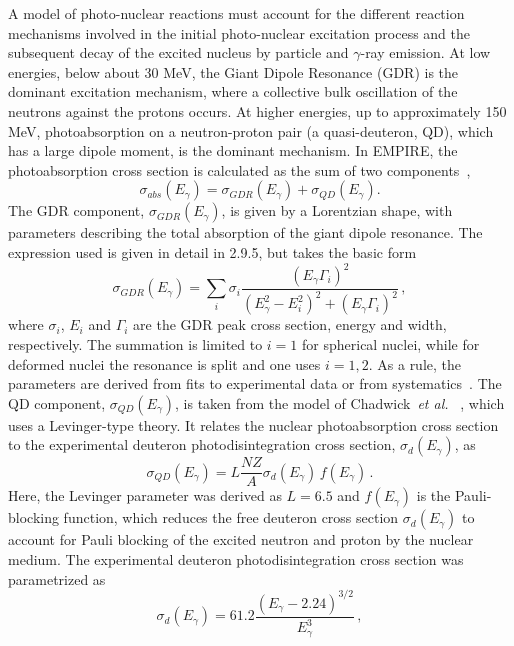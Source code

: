 A model of photo-nuclear reactions must account for the different reaction
mechanisms involved in the initial photo-nuclear excitation process and the
subsequent decay of the excited nucleus by particle and $\gamma$-ray
emission. At low energies, below about 30 MeV, the Giant Dipole Resonance
(GDR) is the dominant excitation mechanism, where a collective bulk
oscillation of the neutrons against the protons occurs. At higher energies,
up to approximately 150 MeV, photoabsorption on a neutron-proton pair (a
quasi-deuteron, QD), which has a large dipole moment, is the dominant
mechanism. In EMPIRE, the photoabsorption cross section is calculated as the
sum of two components~\cite{PHNuc}, 
\begin{equation}
\sigma_{abs}(E_{\gamma})=\sigma_{GDR}(E_{\gamma})+\sigma_{QD}(E_{\gamma}).
\end{equation}
The GDR component, $\sigma_{GDR}(E_{\gamma})$, is given by a Lorentzian
shape, with parameters describing the total absorption of the giant dipole
resonance. The expression used is given in detail in 2.9.5, but takes the
basic form 
\begin{equation}
\sigma_{GDR}(E_{\gamma})=\sum_{i}\sigma_{i}%
\frac{(E_{\gamma}\Gamma_{i})^{2}}{(E_{\gamma}^{2}-E_{i}^{2})^{2}+(E_{\gamma}%
\Gamma_{i})^{2}}\,,
\end{equation}
\noindent where $\sigma_{i}$, $E_{i}$ and $\Gamma_{i}$ are the GDR peak
cross section, energy and width, respectively. The summation is limited to $%
i=1$ for spherical nuclei, while for deformed nuclei the resonance is split
and one uses $i=1,2$. As a rule, the parameters are derived from fits to
experimental data or from systematics~\cite{RIPL2}. The QD component, $%
\sigma_{QD}(E_{\gamma})$, is taken from the model of Chadwick~\emph{et al.}~%
\cite{chadQD}, which uses a Levinger-type theory. It relates the nuclear
photoabsorption cross section to the experimental deuteron
photodisintegration cross section, $\sigma_{d}(E_{\gamma})$, as 
\begin{equation}
\sigma_{QD}(E_{\gamma})=L\frac{NZ}{A}\sigma_{d}(E_{\gamma})\,
f(E_{\gamma})\,.
\end{equation}
Here, the Levinger parameter was derived as $L=6.5$ and $f(E_{\gamma})$ is
the Pauli-blocking function, which reduces the free deuteron cross section $%
\sigma_{d}(E_{\gamma})$ to account for Pauli blocking of the excited neutron
and proton by the nuclear medium. The experimental deuteron
photodisintegration cross section was parametrized as 
\begin{equation}
\sigma_{d}(E_{\gamma})=61.2\frac{(E_{\gamma}-2.24)^{3/2}}{E_{\gamma}^{3}}\,,
\end{equation}
